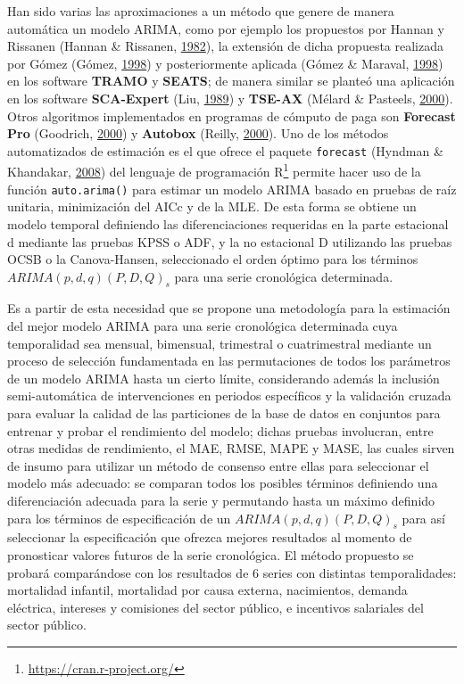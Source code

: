 \documentclass[]{article}
\let\rmarkdownfootnote\footnote%
\def\footnote{\protect\rmarkdownfootnote}
\begin{document}
Han sido varias las aproximaciones a un método que genere de manera
automática un modelo ARIMA, como por ejemplo los propuestos por Hannan y
Rissanen (Hannan \& Rissanen, \protect\hyperlink{ref-hannan}{1982}), la
extensión de dicha propuesta realizada por Gómez (Gómez,
\protect\hyperlink{ref-gomez}{1998}) y posteriormente aplicada (Gómez \&
Maraval, \protect\hyperlink{ref-tramo}{1998}) en los software
\textbf{TRAMO} y \textbf{SEATS}; de manera similar se planteó una
aplicación en los software \textbf{SCA-Expert} (Liu,
\protect\hyperlink{ref-liu}{1989}) y \textbf{TSE-AX} (Mélard \&
Pasteels, \protect\hyperlink{ref-melard}{2000}). Otros algoritmos
implementados en programas de cómputo de paga son \textbf{Forecast Pro}
(Goodrich, \protect\hyperlink{ref-forecastpro}{2000}) y \textbf{Autobox}
(Reilly, \protect\hyperlink{ref-autobox}{2000}). Uno de los métodos
automatizados de estimación es el que ofrece el paquete
\texttt{forecast} (Hyndman \& Khandakar,
\protect\hyperlink{ref-auto.arima}{2008}) del lenguaje de programación
R\footnote{\url{https://cran.r-project.org/}} permite hacer uso de la
función \texttt{auto.arima()} para estimar un modelo ARIMA basado en
pruebas de raíz unitaria, minimización del AICc y de la MLE. De esta
forma se obtiene un modelo temporal definiendo las diferenciaciones
requeridas en la parte estacional d mediante las pruebas KPSS o ADF, y
la no estacional D utilizando las pruebas OCSB o la Canova-Hansen,
seleccionado el orden óptimo para los términos \(ARIMA(p,d,q)(P,D,Q)_s\)
para una serie cronológica determinada.

Es a partir de esta necesidad que se propone una metodología para la
estimación del mejor modelo ARIMA para una serie cronológica determinada
cuya temporalidad sea mensual, bimensual, trimestral o cuatrimestral
mediante un proceso de selección fundamentada en las permutaciones de
todos los parámetros de un modelo ARIMA hasta un cierto límite,
considerando además la inclusión semi-automática de intervenciones en
periodos específicos y la validación cruzada para evaluar la calidad de
las particiones de la base de datos en conjuntos para entrenar y probar
el rendimiento del modelo; dichas pruebas involucran, entre otras
medidas de rendimiento, el MAE, RMSE, MAPE y MASE, las cuales sirven de
insumo para utilizar un método de consenso entre ellas para seleccionar
el modelo más adecuado: se comparan todos los posibles términos
definiendo una diferenciación adecuada para la serie y permutando hasta
un máximo definido para los términos de especificación de un
\(ARIMA(p,d,q)(P,D,Q)_s\) para así seleccionar la especificación que
ofrezca mejores resultados al momento de pronosticar valores futuros de
la serie cronológica. El método propuesto se probará comparándose con
los resultados de 6 series con distintas temporalidades: mortalidad
infantil, mortalidad por causa externa, nacimientos, demanda eléctrica,
intereses y comisiones del sector público, e incentivos salariales del
sector público.
\end{document}
